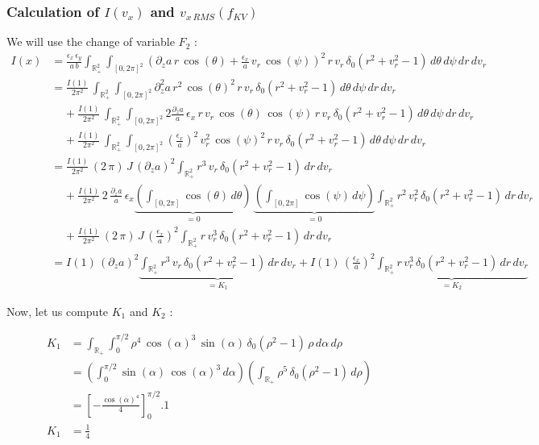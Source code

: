 \documentclass[10pt]{article}
\newcommand{\D}{{\partial}}
\begin{document}
\subsubsection{Calculation of $I(v_x)$ and $v_{x\,RMS}(f_{KV})$}


We will use the change of variable $F_2$ : \\
\begin{align*}
I(x) &= \frac{\epsilon_{x}\,\epsilon_{y}}{a\,b}\int_{\mathbb{R}_{+}^2}\int_{[0,2\pi]^2} \left(\D_{z} a\,r\,\cos(\theta) + \frac{\epsilon_{x}}{a}\,v_r\,\cos(\psi)\right)^2\,r\,v_r\,\delta_{0}
(r^2+v_r^2-1)\,d\theta\,d\psi\,dr\,dv_r \\
&= \frac{I(1)}{2\pi^{2}}\,\int_{\mathbb{R}_{+}^2}\int_{[0,2\pi]^2} \D_{z}^2 a\,r^2\,\cos(\theta)^2\,r\,v_r\,\delta_{0}(r^2+v_r^2-1)\,d\theta\,d\psi\,dr\,dv_r  \\
&\;\;\;\;+ \frac{I(1)}{2\pi^{2}}\,\int_{\mathbb{R}_{+}^2}\int_{[0,2\pi]^2} 2\frac{\D_{z} a}{a}\,\epsilon_{x}\,r\,v_r\,\cos(\theta)\,\cos(\psi)\,r\,v_r\,\delta_{0}(r^2+v_r^2-1)\,d\theta\,d\psi\,dr\,dv_r  \\
&\;\;\;\;+ \frac{I(1)}{2\pi^{2}}\,\int_{\mathbb{R}_{+}^2}\int_{[0,2\pi]^2} \left(\frac{\epsilon_{x}}{a}\right)^2\,v_r^2\,\cos(\psi)^2\,r\,v_r\,\delta_{0}(r^2+v_r^2-1)\,d\theta\,d\psi\,dr\,dv_r  \\
&= \frac{I(1)}{2\pi^{2}}\,(2\,\pi)\,J\,(\D_{z} a)^2\int_{\mathbb{R}_{+}^2} r^3\,v_r\,\delta_{0}(r^2+v_r^2-1)\,dr\,dv_r  \\
&\;\;\;\;+ \frac{I(1)}{2\pi^{2}}\,2\,\frac{\D_{z} a}{a}\,\epsilon_{x}\underbrace{\left(\int_{[0,2\pi]}\cos(\theta)\,d\theta\right)}_{= 0}\,\underbrace{\left(\int_{[0,2\pi]}\cos(\psi)\,d\psi\right)}_{= 0}
\int_{\mathbb{R}_{+}^2}r^2\,v_r^2\,\delta_{0}(r^2+v_r^2-1)\,dr\,dv_r  \\
&\;\;\;\;+ \frac{I(1)}{2\pi^{2}}\,(2\,\pi)\,J\,\left(\frac{\epsilon_{x}}{a}\right)^2\int_{\mathbb{R}_{+}^2}r\,v_r^3\,\delta_{0}(r^2+v_r^2-1)\,dr\,dv_r  \\
&= I(1)\,(\D_{z} a)^2\underbrace{\int_{\mathbb{R}_{+}^2} r^3\,v_r\,\delta_{0}(r^2+v_r^2-1)\,dr\,dv_r}_{= K_1} + I(1)\,\left(\frac{\epsilon_{x}}{a}\right)^2\underbrace{\int_{\mathbb{R}_{+}^2}r\,v_r^3\,\delta_{0}(r^2+v_r^2-1)\,dr\,dv_r}_{= K_2}
\end{align*}

Now, let us compute $K_1$ and $K_2$ : 

\begin{align*}
K_1 &= \int_{\mathbb{R}_{+}}\int_{0}^{\pi/2}\rho^{4}\,\cos(\alpha)^3\,\sin(\alpha)\,\delta_{0}(\rho^{2}-1)\,\rho\,d\alpha\,d\rho \\
&= \left(\int_{0}^{\pi/2}\sin(\alpha)\,\cos(\alpha)^3\,d\alpha\right)\left(\int_{\mathbb{R}_{+}}\rho^{5}\,\delta_{0}(\rho^{2}-1)\,d\rho\right) \\
&= \left[-\frac{\cos(\alpha)^4}{4}\right]_0^{\pi/2}.1 \\
K_1 &= \frac{1}{4}
\end{align*}
\end{document}
